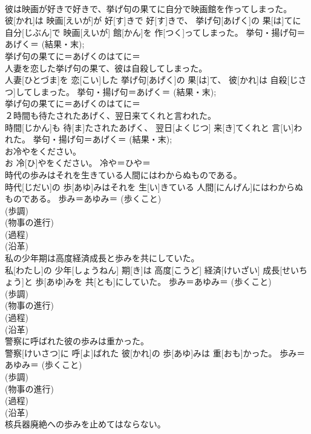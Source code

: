 \documentclass[8pt]{extreport}
\begin{document}
\begin{CJK}{UTF8}{min}
{\\	彼は映画が好きで好きで、挙げ句の果てに自分で映画館を作ってしまった。	
\\	彼[かれ]は 映画[えいが]が 好[す]きで 好[す]きで、 挙げ句[あげく]の 果[は]てに 自分[じぶん]で 映画[えいが] 館[かん]を 作[つく]ってしまった。	挙句・揚げ句＝あげく＝ (結果・末); 
\\	挙げ句の果てに＝あげくのはてに＝ 
\\	人妻を恋した挙げ句の果て、彼は自殺してしまった。	
\\	人妻[ひとづま]を 恋[こい]した 挙げ句[あげく]の 果[は]て、 彼[かれ]は 自殺[じさつ]してしまった。	挙句・揚げ句＝あげく＝ (結果・末); 
\\	挙げ句の果てに＝あげくのはてに＝ 
\\	２時間も待たされたあげく、翌日来てくれと言われた。	
\\	時間[じかん]も 待[ま]たされたあげく、 翌日[よくじつ] 来[き]てくれと 言[い]われた。	挙句・揚げ句＝あげく＝ (結果・末); 
\\	お冷やをください。	
\\	お 冷[ひ]やをください。	冷や＝ひや＝ 
\\	時代の歩みはそれを生きている人間にはわからぬものである。	
\\	時代[じだい]の 歩[あゆ]みはそれを 生[い]きている 人間[にんげん]にはわからぬものである。	歩み＝あゆみ＝ (歩くこと) 
\\	(歩調) 
\\	(物事の進行) 
\\	(過程) 
\\	(沿革) 
\\	私の少年期は高度経済成長と歩みを共にしていた。	
\\	私[わたし]の 少年[しょうねん] 期[き]は 高度[こうど] 経済[けいざい] 成長[せいちょう]と 歩[あゆ]みを 共[とも]にしていた。	歩み＝あゆみ＝ (歩くこと) 
\\	(歩調) 
\\	(物事の進行) 
\\	(過程) 
\\	(沿革) 
\\	警察に呼ばれた彼の歩みは重かった。	
\\	警察[けいさつ]に 呼[よ]ばれた 彼[かれ]の 歩[あゆ]みは 重[おも]かった。	歩み＝あゆみ＝ (歩くこと) 
\\	(歩調) 
\\	(物事の進行) 
\\	(過程) 
\\	(沿革) 
\\	核兵器廃絶への歩みを止めてはならない。	
}
\end{CJK}
\end{document}
